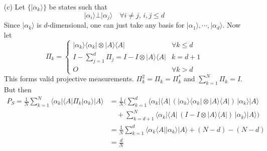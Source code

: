 \begin{enumerate}
\begin{enumerate}
    \item[(c)]
    Let $\{|\alpha_k\rangle\}$ be states such that
    \[
    |\alpha_i\rangle \bot |\alpha_j\rangle \quad \forall i\neq j, \, i,j \leq d
    \]
    Since $|\alpha_k\rangle$ is $d$-dimensional, one can just take any basis for $|\alpha_1\rangle, \cdots,|\alpha_d\rangle$. Now let
    \[
    \Pi_k = \begin{cases}
    |\alpha_k\rangle \langle \alpha_k| \otimes |A\rangle \langle A | & \forall k \leq d \\
    I - \sum_{j=1}^d\Pi_j = I - I \otimes |A\rangle \langle A | & k = d+1 \\
    O & \forall k > d
    \end{cases}
    \]
    This forms valid projective measurements. $\Pi_k^2 = \Pi_k = \Pi_k^*$ and $\sum_{k=1}^N \Pi_k = I$. But then
    \begin{align*}
    P_S = \frac{1}{N} \sum_{k=1}^N \langle \alpha_k | \langle A | \Pi_k | \alpha_k \rangle | A \rangle 
    &= \frac{1}{N} (\sum_{k=1}^d \langle \alpha_k | \langle A | \, (|\alpha_k\rangle \langle \alpha_k| \otimes |A\rangle \langle A |)\, | \alpha_k \rangle | A \rangle \\
    &\quad +  \sum_{k=d+1}^N \langle \alpha_k | \langle A | \, (I - I \otimes |A\rangle\langle A|)\, | \alpha_k \rangle | A \rangle )\\
    &= \frac{1}{N} \sum_{k=1}^d \langle \alpha_k \langle A| |\alpha_k \rangle |A \rangle + (N-d) - (N-d) \\
    &= \frac{d}{N}
    \end{align*}


    
\end{enumerate}


\end{enumerate}


\pagebreak

\nocite{*}
\printbibliography


